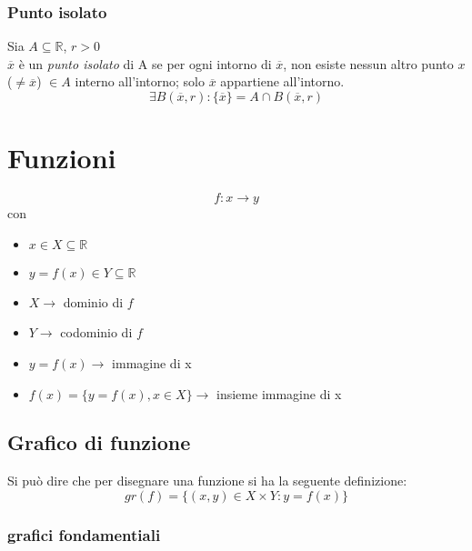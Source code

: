 \documentclass[a4paper,12pt, oneside]{book}
\begin{document}
\subsection{Punto isolato}
\begin{definizione} Sia $A \subseteq \mathbb{R}$, $r>0$\\ $\overline{x}$ è un
  \emph{punto isolato} di A se per ogni intorno di $\overline{x}$, non esiste
  nessun altro punto $x$ ($ \neq \overline{x}$) $\in A$ interno all'intorno; solo
  $\overline{x}$ appartiene all'intorno.
  \begin{equation} \exists B(\overline{x}, r) \colon \{\overline{x}\} = A \cap
    B(\overline{x}, r)
  \end{equation}
\end{definizione}
\chapter{Funzioni}
\begin{equation} f: x \rightarrow y
\end{equation} con
\begin{itemize}
  \item $x \in X \subseteq \mathbb{R}$
  \item $y = f(x) \in Y \subseteq \mathbb{R}$
\end{itemize}
\begin{shaded}
  \begin{itemize}
    \item $X \rightarrow $ dominio di $f$
    \item $Y \rightarrow $ codominio di $f$
    \item $y = f(x) \rightarrow $ immagine di x
    \item $f(x) = \{ y = f(x), x \in X \} \rightarrow $ insieme immagine di x
  \end{itemize}
\end{shaded}
\section{Grafico di funzione} Si può dire che per disegnare una funzione si ha
la seguente definizione: $$gr(f)=\{(x,y)\in X\times Y: y=f(x)\}$$
\subsection{grafici fondamentiali}
\begin{center}
\end{center}
\end{document}
